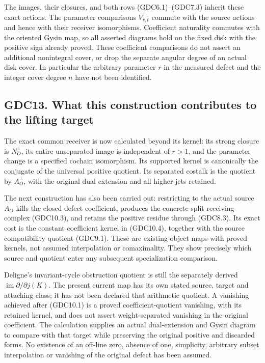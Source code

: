 The images, their closures, and both rows (GDC6.1)--(GDC7.3) inherit
these exact actions. The parameter comparisons \(V_{r,t}\) commute with
the source actions and hence with their receiver isomorphisms.
Coefficient naturality commutes with the oriented Gysin map, so all
asserted diagrams hold on the fixed disk with the positive sign already
proved. These coefficient comparisons do not assert an additional
nonintegral cover, or drop the separate angular degree of an actual disk
cover. In particular the arbitrary parameter \(r\) in the measured
defect and the integer cover degree \(n\) have not been identified.

\subsection{GDC13. What this construction contributes to the lifting
target}\label{gdc13.-what-this-construction-contributes-to-the-lifting-target}

The exact common receiver is now calculated beyond its kernel: its
strong closure is \(N_O^\perp\), its entire unseparated image is
independent of \(r>1\), and the parameter change is a specified cochain
isomorphism. Its supported kernel is canonically the conjugate of the
universal positive quotient. Its separated costalk is the quotient by
\(A_O^\perp\), with the original dual extension and all higher jets
retained.

The next construction has also been carried out: restricting to the
actual source \(A_O\) kills the closed defect coefficient, produces the
concrete split receiving complex (GDC10.3), and retains the positive
residue through (GDC8.3). Its exact cost is the constant coefficient
kernel in (GDC10.4), together with the source compatibility quotient
(GDC9.1). These are existing-object maps with proved kernels, not
assumed interpolation or comaximality. They show precisely which source
and quotient enter any subsequent specialization comparison.

Deligne's invariant-cycle obstruction quotient is still the separately
derived \(\operatorname{im}\partial/\partial j(K)\). The present current
map has its own stated source, target and attaching class; it has not
been declared that arithmetic quotient. A vanishing achieved after
(GDC10.1) is a proved coefficient-quotient vanishing, with its retained
kernel, and does not assert weight-separated vanishing in the original
coefficient. The calculation supplies an actual dual-extension and Gysin
diagram to compare with that target while preserving the original
positive and discarded forms. No existence of an off-line zero, absence
of one, simplicity, arbitrary subset interpolation or vanishing of the
original defect has been assumed.

